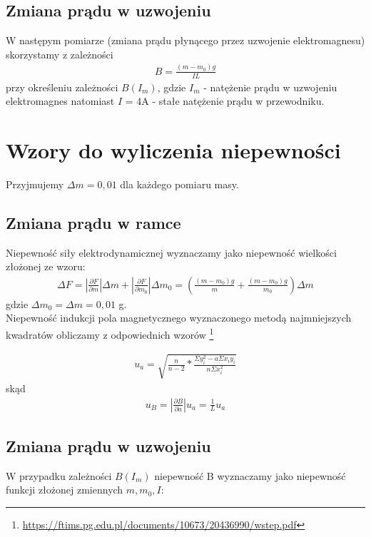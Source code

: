 \documentclass{article}
\begin{document}
\subsection{Zmiana prądu w uzwojeniu}
W następym pomiarze (zmiana prądu płynącego przez uzwojenie elektromagnesu) skorzystamy z zależności
\begin{gather*}
	B = \frac{(m-m_0)g}{IL}
\end{gather*}
przy określeniu zależności $B(I_m)$, gdzie $I_m$ - natężenie prądu w uzwojeniu elektromagnes natomiast $I$ = 4A - stałe natężenie prądu w przewodniku.

\section{Wzory do wyliczenia niepewności}
Przyjmujemy $\Delta m = 0,01$ dla każdego pomiaru masy.

\subsection{Zmiana prądu w ramce}
Niepewność siły elektrodynamicznej wyznaczamy jako niepewność wielkości złożonej ze wzoru:\\
\begin{gather*}
		\Delta F= |\frac{\partial F}{\partial m}| \Delta m + |\frac{\partial F}{\partial m_0}| \Delta m_0  = (\frac{(m - m_0)g }{m} + \frac{(m - m_0)g }{m_0}) \Delta m
\end{gather*}
gdzie $\Delta m_0 =\Delta m = 0,01$ g.
\\Niepewność indukcji pola magnetycznego wyznaczonego metodą najmniejszych kwadratów obliczamy z odpowiednich wzorów  \footnote{\url{https://ftims.pg.edu.pl/documents/10673/20436990/wstep.pdf}}\:

\begin{gather*}
		u_a = \sqrt{\frac{n}{n-2} * \frac{\Sigma y_i^2 - a\Sigma x_iy_i}{n\Sigma x_i^2}} 
\end{gather*}
skąd
\begin{gather*}
		u_B= |\frac{\partial B}{\partial a}| u_a = \frac{1}{L}u_a
\end{gather*}

\subsection{Zmiana prądu w uzwojeniu}
W przypadku zależności $B(I_m)$ niepewność B wyznaczamy jako niepewność funkcji złożonej zmiennych 
$m, m_0, I$:
\end{document}
